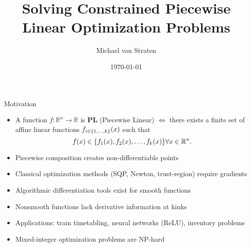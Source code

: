 \documentclass[aspectratio=169]{beamer}
\title{Solving Constrained Piecewise Linear Optimization Problems}
\author{Michael van Straten}
\date{\today}
\institute{Humboldt-Universität zu Berlin}
\DeclarePairedDelimiter{\set}{\lbrace}{\rbrace}
\newcommand{\field}[1]{\mathbb{#1}}
\newcommand{\reals}{\field{R}}
\begin{document}
\begin{frame}
    \titlepage

\end{frame}

\begin{frame}{Motivation}
    \begin{itemize}[<+->]
        \item A function $f \colon \reals^n \to \reals$ is \textbf{PL}
              (Piecewise Linear) \(\iff\) there exists a finite set of affine
              linear functions $f_{i \in \set{1, \dots, k}}(x)$ such that
              \[
                  f(x) \in \set{f_1(x), f_2(x), \dots, f_k(x)}
                  \forall x \in \reals^n.
              \]
        \item<2-> Piecewise composition creates non-differentiable points
        \item<3-> Classical optimization methods (SQP, Newton, trust-region)
              require gradients
        \item<4-> Algorithmic differentiation tools exist for smooth functions
        \item<5-> Nonsmooth functions lack derivative information at kinks
        \item<6-> Applications: train timetabling, neural networks (ReLU),
              inventory problems
        \item<7-> Mixed-integer optimization problems are NP-hard
    \end{itemize}


\end{frame}
\end{document}
